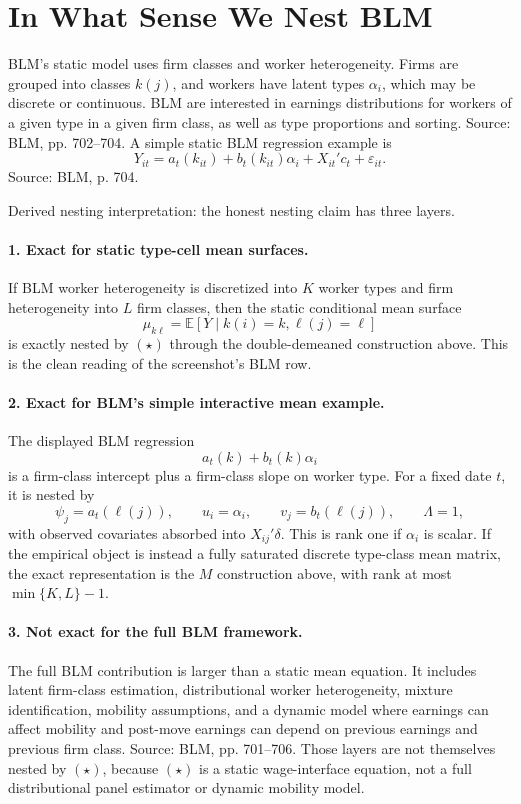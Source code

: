 \documentclass[11pt]{article}
\newcommand{\E}{\mathbb{E}}
\newcommand{\1}{\mathbf{1}}
\begin{document}
\section{In What Sense We Nest BLM}

BLM's static model uses firm classes and worker heterogeneity. Firms are grouped
into classes $k(j)$, and workers have latent types $\alpha_i$, which may be
discrete or continuous. BLM are interested in earnings distributions for workers
of a given type in a given firm class, as well as type proportions and sorting.
Source: BLM, pp. 702--704. A simple static BLM regression example is
\[
Y_{it}=a_t(k_{it})+b_t(k_{it})\alpha_i+X_{it}'c_t+\varepsilon_{it}.
\]
Source: BLM, p. 704.

Derived nesting interpretation: the honest nesting claim has three layers.

\paragraph{1. Exact for static type-cell mean surfaces.}
If BLM worker heterogeneity is discretized into $K$ worker types and firm
heterogeneity into $L$ firm classes, then the static conditional mean surface
\[
\mu_{k\ell}
=
\E[Y\mid k(i)=k,\ell(j)=\ell]
\]
is exactly nested by $(\star)$ through the double-demeaned construction above.
This is the clean reading of the screenshot's BLM row.

\paragraph{2. Exact for BLM's simple interactive mean example.}
The displayed BLM regression
\[
a_t(k)+b_t(k)\alpha_i
\]
is a firm-class intercept plus a firm-class slope on worker type. For a fixed
date $t$, it is nested by
\[
\psi_j=a_t(\ell(j)),
\qquad
u_i=\alpha_i,
\qquad
v_j=b_t(\ell(j)),
\qquad
\Lambda=1,
\]
with observed covariates absorbed into $X_{ij}'\delta$. This is rank one if
$\alpha_i$ is scalar. If the empirical object is instead a fully saturated
discrete type-class mean matrix, the exact representation is the $M$ construction
above, with rank at most $\min\{K,L\}-1$.

\paragraph{3. Not exact for the full BLM framework.}
The full BLM contribution is larger than a static mean equation. It includes
latent firm-class estimation, distributional worker heterogeneity, mixture
identification, mobility assumptions, and a dynamic model where earnings can
affect mobility and post-move earnings can depend on previous earnings and
previous firm class. Source: BLM, pp. 701--706. Those layers are not themselves
nested by $(\star)$, because $(\star)$ is a static wage-interface equation, not a
full distributional panel estimator or dynamic mobility model.
\end{document}
